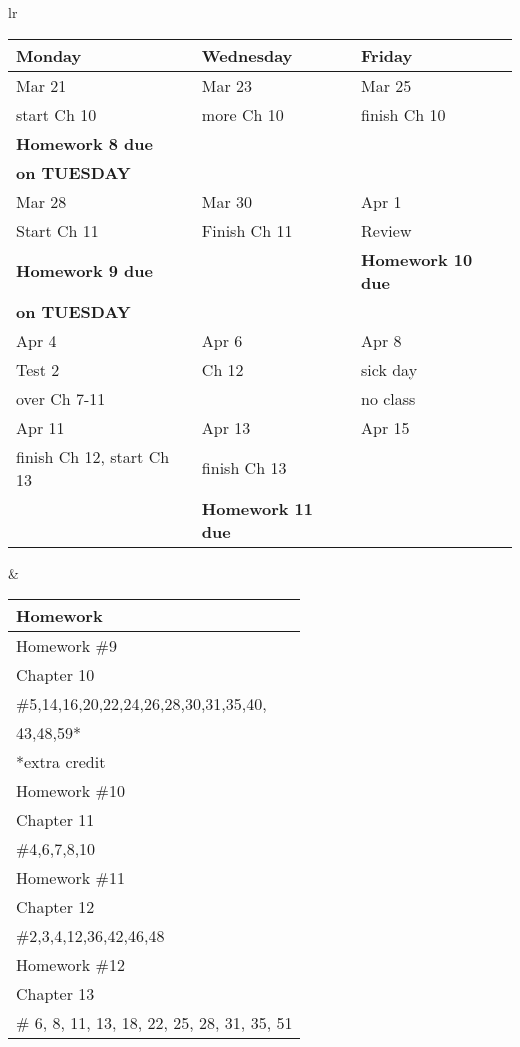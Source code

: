 \documentclass[11pt]{article}
\begin{document}
\newpage
\begin{tabular}{lr}
\begin{tabular}{|l|l|l|}
\hline
Monday & Wednesday & Friday \\
\hline \hline
Mar 21&Mar 23 & Mar 25\\
start Ch 10&more Ch 10&finish Ch 10\\
\textbf{Homework 8 due}&&\\
\textbf{on TUESDAY}&&\\
\hline
Mar 28 & Mar 30 & Apr 1 \\
Start Ch 11 &Finish Ch 11&Review\\
\textbf{Homework 9 due}&&\textbf{Homework 10 due}\\
\textbf{on TUESDAY}&&\\
\hline
Apr 4 & Apr 6 & Apr 8 \\
Test 2 & Ch 12 & sick day  \\
over Ch 7-11 &&no class\\
\hline
Apr 11& Apr 13 & Apr 15 \\
finish Ch 12, start Ch 13&finish Ch 13&\\
 &\textbf{Homework 11 due}&\\
\hline
\end{tabular}
&
\begin{tabular}{|p{6cm}|}
\hline
Homework \\
\hline \hline
Homework \#9\\
Chapter 10\\
\#5,14,16,20,22,24,26,28,30,31,35,40,\\
43,48,59*\\
*extra credit \\
\hline
Homework \#10\\
Chapter 11\\
\#4,6,7,8,10\\
\hline
Homework \#11\\
Chapter 12\\
\#2,3,4,12,36,42,46,48\\
\hline
Homework \#12\\
Chapter 13\\
\# 6, 8, 11, 13, 18, 22, 25, 28, 31, 35, 51\\
\hline
\end{tabular}
\end{tabular}
\end{document}
